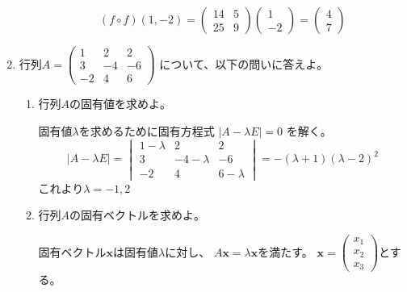 \documentclass[10pt,b5paper]{ltjsarticle}
\begin{document}
\begin{enumerate}
\begin{enumerate}
              \begin{equation}
               (f\circ f)(1,-2)=
                \begin{pmatrix} 14&5\\ 25&9\end{pmatrix}
                \begin{pmatrix} 1\\ -2\end{pmatrix}
                =\begin{pmatrix} 4\\ 7\end{pmatrix}
              \end{equation}
       \end{enumerate}
       \hrulefill
 \item 行列$A=\begin{pmatrix} 1&2&2\\ 3&-4&-6\\ -2&4&6\end{pmatrix}$
       について、以下の問いに答えよ。
       \begin{enumerate}
        \item 行列$A$の固有値を求めよ。

              \dotfill

              固有値$\lambda$を求めるために固有方程式
              $\lvert A -\lambda E \rvert =0$
              を解く。
              \begin{equation}
               \lvert A -\lambda E \rvert
                =
               \begin{vmatrix}
               1-\lambda &2&2\\ 3&-4-\lambda &-6\\ -2&4&6-\lambda
               \end{vmatrix}
               =-(λ+1)(λ-2)^2
              \end{equation}
              これより$\lambda =-1, 2$


              \hrulefill
        \item 行列$A$の固有ベクトルを求めよ。

              \dotfill

              固有ベクトル$\bm{x}$は固有値$\lambda$に対し、
              $A\bm{x}=\lambda\bm{x}$を満たす。
              $\bm{x}=\begin{pmatrix} x_1\\ x_2\\ x_3\end{pmatrix}$とする。


\end{enumerate}
\end{enumerate}
\end{document}

